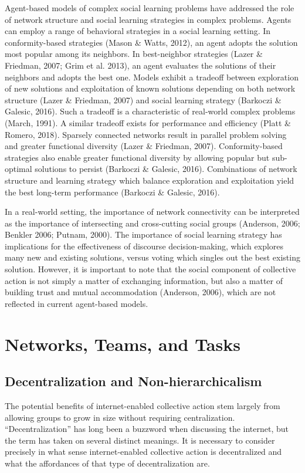Agent-based models of complex social learning problems have addressed the role of network structure and social learning strategies in complex problems. Agents can employ a range of behavioral strategies in a social learning setting. In conformity-based strategies (Mason \& Watts, 2012), an agent adopts the solution most popular among its neighbors. In best-neighbor strategies (Lazer \& Friedman, 2007; Grim et al. 2013), an agent evaluates the solutions of their neighbors and adopts the best one. Models exhibit a tradeoff between exploration of new solutions and exploitation of known solutions depending on both network structure (Lazer \& Friedman, 2007) and social learning strategy (Barkoczi \& Galesic, 2016). Such a tradeoff is a characteristic of real-world complex problems (March, 1991). A similar tradeoff exists for performance and efficiency (Platt \& Romero, 2018). Sparsely connected networks result in parallel problem solving and greater functional diversity (Lazer \& Friedman, 2007). Conformity-based strategies also enable greater functional diversity by allowing popular but sub-optimal solutions to persist (Barkoczi \& Galesic, 2016). Combinations of network structure and learning strategy which balance exploration and exploitation yield the best long-term performance (Barkoczi \& Galesic, 2016).

In a real-world setting, the importance of network connectivity can be interpreted as the importance of intersecting and cross-cutting social groups (Anderson, 2006; Benkler 2006; Putnam, 2000). The importance of social learning strategy has implications for the effectiveness of discourse decision-making, which explores many new and existing solutions, versus voting which singles out the best existing solution. However, it is important to note that the social component of collective action is not simply a matter of exchanging information, but also a matter of building trust and mutual accommodation (Anderson, 2006), which are not reflected in current agent-based models.

\section{Networks, Teams, and Tasks}\label{sec:network-teams}
\subsection{Decentralization and Non-hierarchicalism}
The potential benefits of internet-enabled collective action stem largely from allowing groups to grow in size without requiring centralization. ``Decentralization'' has long been a buzzword when discussing the internet, but the term has taken on several distinct meanings. It is necessary to consider precisely in what sense internet-enabled collective action is decentralized and what the affordances of that type of decentralization are.

